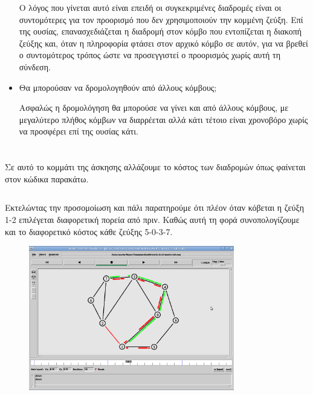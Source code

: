 \documentclass[a4paper,9pt]{article}
\begin{document}
\begin{itemize}
        Ο λόγος που γίνεται αυτό είναι επειδή οι συγκεκριμένες διαδρομές είναι οι
        συντομότερες για τον προορισμό που δεν χρησιμοποιούν την κομμένη ζεύξη. Επί
        της ουσίας, επανασχεδιάζεται η διαδρομή στον κόμβο που εντοπίζεται η διακοπή
        ζεύξης και, όταν η πληροφορία φτάσει στον αρχικό κόμβο σε αυτόν, για να βρεθεί
        ο συντομότερος τρόπος ώστε να προσεγγιστεί ο προορισμός χωρίς αυτή τη σύνδεση.
    \item Θα μπορούσαν να δρομολογηθούν από άλλους κόμβους;

        Ασφαλώς η δρομολόγηση θα μπορούσε να γίνει και από άλλους κόμβους, με
        μεγαλύτερο πλήθος κόμβων να διαρρέεται αλλά κάτι τέτοιο είναι χρονοβόρο χωρίς
        να προσφέρει επί της ουσίας κάτι.
\end{itemize}


\section{}
Σε αυτό το κομμάτι της άσκησης αλλάζουμε το κόστος των διαδρομών όπως φαίνεται
στον κώδικα παρακάτω.

\inputminted[fontsize=\footnotesize]{tcl}{files/ex3_3.tcl}

Εκτελώντας την προσομοίωση και πάλι παρατηρούμε ότι πλέον όταν κόβεται η ζεύξη
1-2 επιλέγεται διαφορετική πορεία από πριν. Καθώς  αυτή τη φορά
συνοπολογίζουμε και το διαφορετικό κόστος κάθε ζεύξης 5-0-3-7.

\begin{figure}[h]
    \centering
    \includegraphics[width=0.8\textwidth]{files/8.png}
\end{figure}
\end{document}
